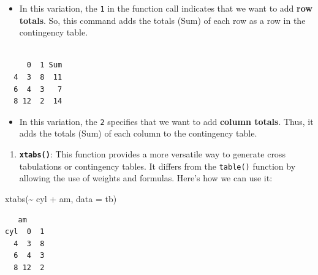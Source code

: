 \documentclass[
  letterpaper,
  DIV=11,
  numbers=noendperiod]{scrreport}
\newenvironment{Shaded}{\begin{snugshade}}{\end{snugshade}}
\newcommand{\AttributeTok}[1]{\textcolor[rgb]{0.40,0.45,0.13}{#1}}
\newcommand{\DecValTok}[1]{\textcolor[rgb]{0.68,0.00,0.00}{#1}}
\newcommand{\FunctionTok}[1]{\textcolor[rgb]{0.28,0.35,0.67}{#1}}
\newcommand{\NormalTok}[1]{\textcolor[rgb]{0.00,0.23,0.31}{#1}}
\newcommand{\SpecialCharTok}[1]{\textcolor[rgb]{0.37,0.37,0.37}{#1}}
\providecommand{\tightlist}{%
  \setlength{\itemsep}{0pt}\setlength{\parskip}{0pt}}\usepackage{longtable,booktabs,array}
\begin{document}
\begin{itemize}
\tightlist
\item
  In this variation, the \texttt{1} in the function call indicates that
  we want to add \textbf{row totals}. So, this command adds the totals
  (Sum) of each row as a row in the contingency table.
\end{itemize}

\begin{Shaded}
\end{Shaded}

\begin{verbatim}
   
     0  1 Sum
  4  3  8  11
  6  4  3   7
  8 12  2  14
\end{verbatim}

\begin{itemize}
\tightlist
\item
  In this variation, the \texttt{2} specifies that we want to add
  \textbf{column totals}. Thus, it adds the totals (Sum) of each column
  to the contingency table.
\end{itemize}

\begin{enumerate}
\def\labelenumi{\arabic{enumi}.}
\setcounter{enumi}{2}
\tightlist
\item
  \textbf{\texttt{xtabs()}}: This function provides a more versatile way
  to generate cross tabulations or contingency tables. It differs from
  the \texttt{table()} function by allowing the use of weights and
  formulas. Here's how we can use it:
\end{enumerate}

\begin{Shaded}
\begin{Highlighting}[]
\FunctionTok{xtabs}\NormalTok{(}\SpecialCharTok{\textasciitilde{}}\NormalTok{ cyl }\SpecialCharTok{+}\NormalTok{ am, }
      \AttributeTok{data =}\NormalTok{ tb)}
\end{Highlighting}
\end{Shaded}

\begin{verbatim}
   am
cyl  0  1
  4  3  8
  6  4  3
  8 12  2
\end{verbatim}
\end{document}
